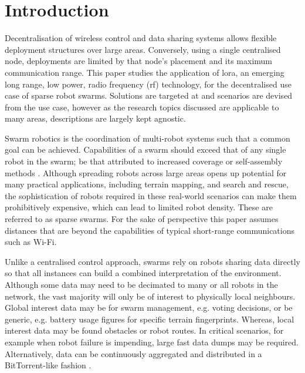 \chapter{Introduction}
Decentralisation of wireless control and data sharing systems allows flexible deployment structures over large areas. Conversely, using a single centralised node, deployments are limited by that node's placement and its maximum communication range. This paper studies the application of \ac{lora}, an emerging long range, low power, radio frequency (\ac{rf}) technology, for the decentralised use case of sparse robot swarms. Solutions are targeted at and scenarios are devised from the use case, however as the research topics discussed are applicable to many areas, descriptions are largely kept agnostic. 
  
Swarm robotics is the coordination of multi-robot systems such that a common goal can be achieved. Capabilities of a swarm should exceed that of any single robot in the swarm; be that attributed to increased coverage \cite{Ducatelle:2011:Pathfinding} or self-assembly methods \cite{3YP:OBSTACLE_SWARMS}. 
 Although spreading robots across large areas opens up potential for many practical applications, including terrain mapping, and search and rescue, the sophistication of robots required in these real-world scenarios can make them prohibitively expensive, which can lead to limited robot density. These are referred to as sparse swarms. For the sake of perspective this paper assumes distances that are beyond the capabilities of typical short-range communications such as Wi-Fi.
 
Unlike a centralised control approach, swarms rely on robots sharing data directly so that all instances can build a combined interpretation of the environment. Although some data may need to be decimated to many or all robots in the network, the vast majority will only be of interest to physically local neighbours. Global interest data may be for swarm management, e.g. voting decisions, or be generic, e.g. battery usage figures for specific terrain fingerprints. Whereas, local interest data may be found obstacles or robot routes. In critical scenarios, for example when robot failure is impending, large fast data dumps may be required. Alternatively, data can be continuously aggregated and distributed in a BitTorrent-like fashion \cite{3YP:SOUL}.

